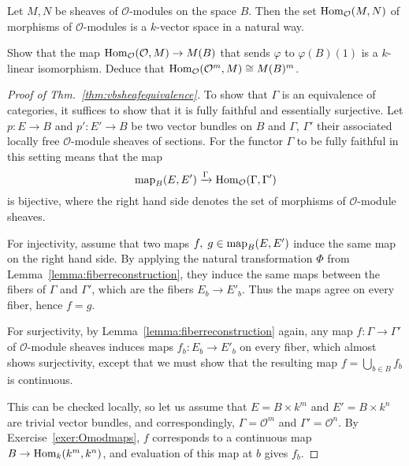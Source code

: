\documentclass[a4paper,openany]{scrbook}
\begin{document}
Let  $M,N$ be sheaves of $\mathcal O$-modules on the space $B$. Then the set $\operatorname{Hom}_{\mathcal O} (M,N)$ of morphisms of $\mathcal{O}$-modules is a $k$-vector space in a natural way. 

\begin{exer}
	\label{exer:Omodmaps}
	Show that the map $\operatorname{Hom}_{\mathcal O} (\mathcal O,M) \to M(B)$ that sends $\varphi$ to $\varphi(B)(1)$ is a $k$-linear isomorphism. Deduce that $\operatorname{Hom}_{\mathcal O} (\mathcal O^m,M) \cong M(B)^m$.
\end{exer}	

\begin{proof}[Proof of Thm.~\ref{thm:vbsheafequivalence}]
To show that $\Gamma$ is an equivalence of categories, it suffices to show that it is fully faithful and essentially surjective. Let $p\colon E \to B$ and $p'\colon E' \to B$ be two vector bundles on $B$ and $\Gamma$, $\Gamma'$ their associated locally free $\mathcal O$-module sheaves of sections. For the functor $\Gamma$ to be fully faithful in this setting means that the map
\[
\operatorname{map}_B(E,E') \xrightarrow{\Gamma} \operatorname{Hom}_{\mathcal O}(\Gamma,\Gamma')
\]
is bijective, where the right hand side denotes the set of morphisms of $\mathcal O$-module sheaves.

For injectivity, assume that two maps $f,\; g \in \operatorname{map}_B(E,E')$ induce the same map on the right hand side. By applying the natural transformation $\Phi$ from Lemma~\ref{lemma:fiberreconstruction}, they induce the same maps between the fibers of $\Gamma$ and $\Gamma'$, which are the fibers $E_b \to E'_b$. Thus the maps agree on every fiber, hence $f=g$.

For surjectivity, by Lemma~\ref{lemma:fiberreconstruction} again, any map $f\colon \Gamma \to \Gamma'$ of $\mathcal O$-module sheaves induces maps $f_b\colon E_b \to E'_b$ on every fiber, which almost shows surjectivity, except that we must show that the resulting map $f = \bigcup_{b \in B} f_b$ is continuous.

This can be checked locally, so let us assume that $E = B \times k^m$ and $E' = B \times k^n$ are trivial vector bundles, and correspondingly, $\Gamma = \mathcal O^m$ and $\Gamma' = \mathcal O^n$. By Exercise~\ref{exer:Omodmaps}, $f$ corresponds to a continuous map $B \to \operatorname{Hom}_k(k^m,k^n)$, and evaluation of this map at $b$ gives $f_b$.


\end{proof}
\end{document}
